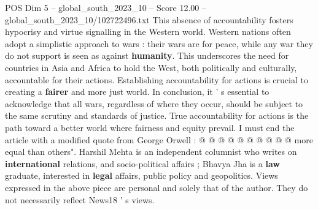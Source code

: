 \begin{textsample}{POS Dim 5 – global\_south\_2023\_10 – Score 12.00 – global\_south\_2023\_10/102722496.txt}
This absence of accountability fosters hypocrisy and virtue signalling in the Western world.
Western nations often adopt a simplistic approach to wars : their wars are for peace, while any war they do not support is seen as against \textbf{humanity}.
This underscores the need for countries in Asia and Africa to hold the West, both politically and culturally, accountable for their actions.
Establishing accountability for actions is crucial to creating a \textbf{fairer} and more just world.
In conclusion, it ' s essential to acknowledge that all wars, regardless of where they occur, should be subject to the same scrutiny and standards of justice.
True accountability for actions is the path toward a better world where fairness and equity prevail.
I must end the article with a modified quote from George Orwell : @ @ @ @ @ @ @ @ @ @ more equal than others".
Harshil Mehta is an independent columnist who writes on \textbf{international} relations, and socio-political affairs ; Bhavya Jha is a \textbf{law} graduate, interested in \textbf{legal} affairs, public policy and geopolitics.
Views expressed in the above piece are personal and solely that of the author.
They do not necessarily reflect News18 ' s views.

\end{textsample}
